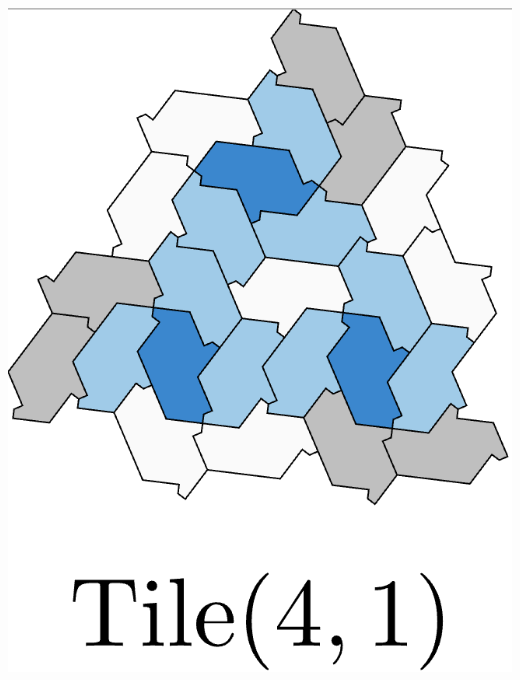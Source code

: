 \documentclass[class=beamer, crop=false]{standalone}
\begin{document}
\begin{minipage}{0.24\textwidth}
\begin{minipage}[t]{0.24\textwidth}
    \includegraphics[width=\linewidth]{images/polykite-family/tile(4,1).png}
  \end{minipage}\hfill
  \begin{minipage}[t]{0.24\textwidth}
    \centering

\end{minipage}
\end{minipage}
\end{document}
